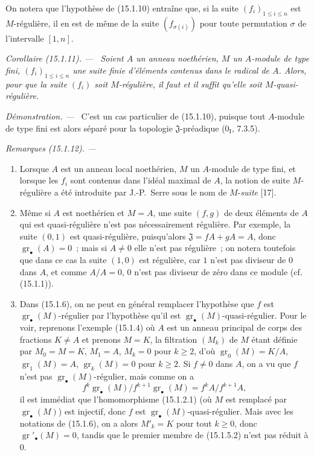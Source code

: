 \documentclass[10pt,oneside]{book}
\makeatletter
\newcommand{\gr}{\operatorname{gr}}
\newcommand{\setmanualcurrentlabel}[1]{\def\@currentlabel{#1}}
\newcommand{\oldpage}[2][]{%
  \setcounter{footnote}{0}%
  \marginpar{\scriptsize\textbf{#1}~|~#2}\ignorespaces}
\newenvironment{corollary}[1][]{%
  \setmanualcurrentlabel{#1}\par\medskip\noindent\itshape Corollaire (#1). ---\ }{\par}
\newenvironment{remarks}[1][]{%
  \setmanualcurrentlabel{#1}\par\medskip\noindent\itshape Remarques (#1). ---\ }{\par}
\newenvironment{proof}{%
  \par\medskip\noindent\textit{Démonstration. ---\ }}{\par}
\makeatother
\begin{document}
On notera que l'hypothèse de (15.1.10) entraîne que, si la suite
$(f_i)_{1\leq i\leq n}$ est $M$-régulière, il en est de même de la suite
$(f_{\sigma(i)})$ pour toute permutation $\sigma$ de l'intervalle $[1,n]$.

\begin{corollary}[15.1.11]
\label{0.15.1.11-fr}
Soient $A$ un anneau noethérien, $M$ un $A$-module de type fini,
$(f_i)_{1\leq i\leq n}$ une suite finie d'éléments contenus dans le radical de
$A$. Alors, pour que la suite $(f_i)$ soit $M$-régulière, il faut et il suffit
qu'elle soit $M$-quasi-régulière.
\end{corollary}

\begin{proof}
C'est un cas particulier de (15.1.10), puisque tout $A$-module de type fini
est alors séparé pour la topologie $\mathfrak{J}$-préadique
($0_{\mathrm I}$, 7.3.5).
\end{proof}

\begin{remarks}[15.1.12]
\label{0.15.1.12-fr}
\mbox{}
\begin{enumerate}
  \item[(i)] Lorsque $A$ est un anneau local noethérien, $M$ un $A$-module de
  type fini, et lorsque les $f_i$ sont contenus dans l'idéal maximal de $A$,
  la notion de suite $M$-régulière a été introduite par J.-P.~Serre sous le
  nom de $M$-\emph{suite} [17].
  \item[(ii)] Même si $A$ est noethérien et $M=A$, une suite $(f,g)$ de deux
  éléments de $A$ qui est quasi-régulière n'est pas nécessairement régulière.
  Par exemple, la suite $(0,1)$ est quasi-régulière, puisqu'alors
  $\mathfrak{J}=fA+gA=A$, donc $\gr_\bullet(A)=0$~; mais si $A\neq0$ elle
  n'est pas régulière~; on notera toutefois que dans ce cas la suite $(1,0)$
  est régulière, car $1$ n'est pas diviseur de $0$ dans $A$, et comme
  $A/A=0$, $0$ n'est pas diviseur de zéro dans ce module (cf. (15.1.1)).
  \item[(iii)]
  \oldpage[0\textsubscript{IV-1}]{17}
  Dans (15.1.6), on ne peut en général remplacer l'hypothèse que $f$ est
  $\gr_\bullet(M)$-régulier par l'hypothèse qu'il est
  $\gr_\bullet(M)$-quasi-régulier. Pour le voir, reprenons l'exemple (15.1.4)
  où $A$ est un anneau principal de corps des fractions $K\neq A$ et prenons
  $M=K$, la filtration $(M_k)$ de $M$ étant définie par
  $M_0=M=K$, $M_1=A$, $M_k=0$ pour $k\geq2$, d'où
  $\gr_0(M)=K/A$, $\gr_1(M)=A$, $\gr_k(M)=0$ pour $k\geq2$. Si $f\neq0$ dans
  $A$, on a vu que $f$ n'est pas $\gr_\bullet(M)$-régulier, mais comme on a
  \[
    f^k\gr_\bullet(M)/f^{k+1}\gr_\bullet(M)=f^kA/f^{k+1}A,
  \]
  il est immédiat que l'homomorphisme (15.1.2.1) (où $M$ est remplacé par
  $\gr_\bullet(M)$) est injectif, donc $f$ est
  $\gr_\bullet(M)$-quasi-régulier. Mais avec les notations de (15.1.6), on a
  alors $M'_k=K$ pour tout $k\geq0$, donc $\gr'_\bullet(M)=0$, tandis que le
  premier membre de (15.1.5.2) n'est pas réduit à $0$.
\end{enumerate}
\end{remarks}
\end{document}
